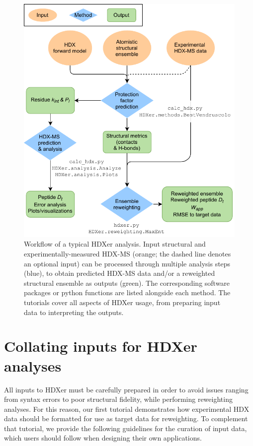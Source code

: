 \documentclass[9pt,tutorial]{livecoms}
\begin{document}
\begin{figure}
    \includegraphics[width=0.98\linewidth]{Fig2_HDXer_workflow_vertical.pdf}
    \caption{Workflow of a typical HDXer analysis. Input structural and experimentally-measured HDX-MS (orange; the dashed line denotes an optional input) can be processed through multiple analysis steps (blue), to obtain predicted HDX-MS data and/or a reweighted structural ensemble as outputs (green). The corresponding software packages or python functions are listed alongside each method. The tutorials cover all aspects of HDXer usage, from preparing input data to interpreting the outputs.}
    \label{fig:workflowfig}
\end{figure}

\section{Collating inputs for HDXer analyses}\label{collating_inputs}
All inputs to HDXer must be carefully prepared in order to avoid issues ranging from syntax errors to poor structural fidelity, while performing reweighting analyses. 
For this reason, our first tutorial demonstrates how experimental HDX data should be formatted for use as target data for reweighting.
To complement that tutorial, we provide the following guidelines for the curation of input data, which users should follow when designing their own applications.
\end{document}
